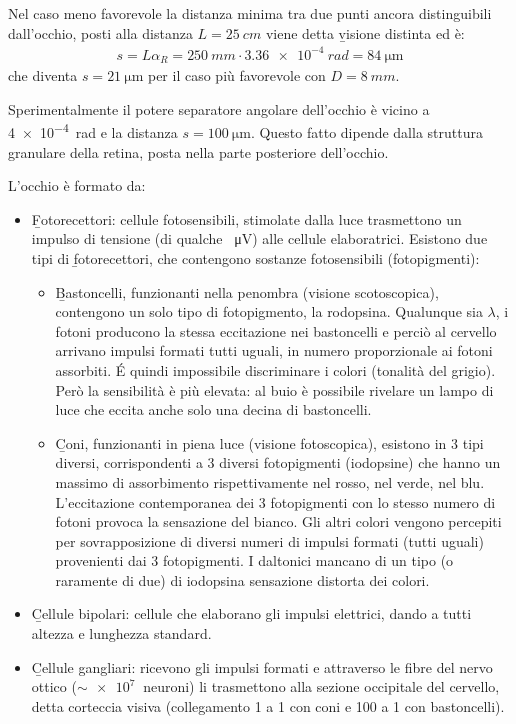 Nel caso meno favorevole la distanza minima tra due punti ancora distinguibili dall'occhio, posti alla distanza $L=\SI{25}{cm}$ viene detta \b{visione distinta} ed è:
\begin{equation}\begin{split}
s=L\alpha_R=\SI{250}{mm}\cdot\SI{3.36e-4}{rad}=\SI{84}{\um}
\end{split}\end{equation}
che diventa $s=\SI{21}{\um}$ per il caso più favorevole con $D=\SI{8}{mm}$.

Sperimentalmente il potere separatore angolare dell'occhio è vicino a \SI{4e-4}{rad} e la distanza $s=\SI{100}{\um}$. Questo fatto dipende dalla struttura granulare della retina, posta nella parte posteriore dell'occhio.

L'occhio è formato da:
\begin{itemize}
\item \b{Fotorecettori}: cellule fotosensibili, stimolate dalla luce trasmettono un impulso di tensione (di qualche \SI{}{\uV}) alle cellule elaboratrici. Esistono due tipi di \b{fotorecettori}, che contengono sostanze fotosensibili (fotopigmenti):
\begin{itemize}
\item \b{Bastoncelli}, funzionanti nella penombra (visione scotoscopica), contengono un solo tipo di fotopigmento, la rodopsina. Qualunque sia $\lambda$, i fotoni producono la stessa eccitazione nei bastoncelli e perciò al cervello arrivano impulsi formati tutti uguali, in numero proporzionale ai fotoni assorbiti. \'E quindi impossibile discriminare i colori (tonalità del grigio). Però la sensibilità è più elevata: al buio è possibile rivelare un lampo di luce che eccita anche solo una decina di bastoncelli.
\item \b{Coni}, funzionanti in piena luce (visione fotoscopica), esistono in 3 tipi diversi, corrispondenti a 3 diversi fotopigmenti (iodopsine) che hanno un massimo di assorbimento rispettivamente nel rosso, nel verde, nel blu. L'eccitazione contemporanea dei 3 fotopigmenti con lo stesso numero di fotoni provoca la sensazione del bianco. Gli altri colori vengono percepiti per sovrapposizione di diversi numeri di impulsi formati (tutti uguali) provenienti dai 3 fotopigmenti. I daltonici mancano di un tipo (o raramente di due) di iodopsina sensazione distorta dei colori.\end{itemize}
\item \b{Cellule bipolari}: cellule che elaborano gli impulsi elettrici, dando a tutti altezza e lunghezza standard.
\item \b{Cellule gangliari}: ricevono gli impulsi formati e attraverso le fibre del nervo ottico ($\sim\SI{e7}{}$ neuroni) li trasmettono alla sezione occipitale del cervello, detta corteccia visiva (collegamento 1 a 1 con coni e 100 a 1 con bastoncelli).
\end{itemize}
